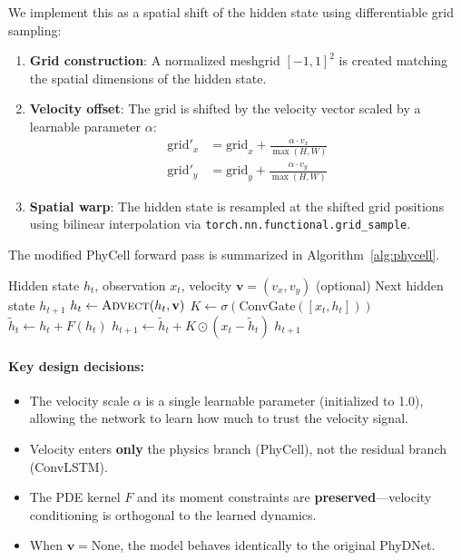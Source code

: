 \documentclass[11pt,a4paper]{article}
\begin{document}
We implement this as a spatial shift of the hidden state using differentiable grid sampling:

\begin{enumerate}[nosep]
    \item \textbf{Grid construction}: A normalized meshgrid $[-1, 1]^2$ is created matching the spatial dimensions of the hidden state.
    \item \textbf{Velocity offset}: The grid is shifted by the velocity vector scaled by a learnable parameter $\alpha$:
    \begin{align}
        \text{grid}'_x &= \text{grid}_x + \frac{\alpha \cdot v_x}{\max(H, W)} \label{eq:grid_x} \\
        \text{grid}'_y &= \text{grid}_y + \frac{\alpha \cdot v_y}{\max(H, W)} \label{eq:grid_y}
    \end{align}
    \item \textbf{Spatial warp}: The hidden state is resampled at the shifted grid positions using bilinear interpolation via \texttt{torch.nn.functional.grid\_sample}.
\end{enumerate}

The modified PhyCell forward pass is summarized in Algorithm~\ref{alg:phycell}.

\begin{algorithm}[htbp]
\caption{PhyCell with velocity advection}
\label{alg:phycell}
\begin{algorithmic}[1]
\Require Hidden state $h_t$, observation $x_t$, velocity $\mathbf{v} = (v_x, v_y)$ (optional)
\Ensure Next hidden state $h_{t+1}$
    \State $h_t \gets \textsc{Advect}(h_t, \mathbf{v})$ 
\EndIf
\State $K \gets \sigma(\text{ConvGate}([x_t, h_t]))$ 
\State $\tilde{h}_t \gets h_t + F(h_t)$ 
\State $h_{t+1} \gets \tilde{h}_t + K \odot (x_t - \tilde{h}_t)$ 
\State \Return $h_{t+1}$
\end{algorithmic}
\end{algorithm}

\paragraph{Key design decisions:}
\begin{itemize}[nosep]
    \item The velocity scale $\alpha$ is a single learnable parameter (initialized to 1.0), allowing the network to learn how much to trust the velocity signal.
    \item Velocity enters \textbf{only} the physics branch (PhyCell), not the residual branch (ConvLSTM).
    \item The PDE kernel $F$ and its moment constraints are \textbf{preserved}---velocity conditioning is orthogonal to the learned dynamics.
    \item When $\mathbf{v} = \text{None}$, the model behaves identically to the original PhyDNet.
\end{itemize}
\end{document}

